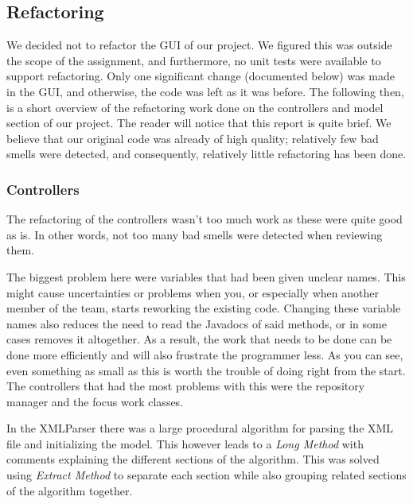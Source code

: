 		\subsection{Refactoring}
			We decided not to refactor the GUI of our project. We figured this was outside the scope of the assignment, and furthermore, no unit tests were available to support refactoring. Only one significant change (documented below) was made in the GUI, and otherwise, the code was left as it was before. The following then, is a short overview of the refactoring work done on the controllers and model section of our project. The reader will notice that this report is quite brief. We believe that our original code was already of high quality; relatively few bad smells were detected, and consequently, relatively little refactoring has been done.

			\subsubsection{Controllers}
				The refactoring of the controllers wasn't too much work as these were quite good as is. In other words, not too many bad smells were detected when reviewing them.
				
				The biggest problem here were variables that had been given unclear names. This might cause uncertainties or problems when you, or especially when another member of the team, starts reworking the existing code. Changing these variable names also reduces the need to read the Javadocs of said methods, or in some cases removes it altogether. As a result, the work that needs to be done can be done more efficiently and will also frustrate the programmer less. As you can see, even something as small as this is worth the trouble of doing right from the start. 
				The controllers that had the most problems with this were the repository manager and the focus work classes.
				
				In the XMLParser there was a large procedural algorithm for parsing the XML file and initializing the model. This however leads to a \emph{Long Method} with comments explaining the different sections of the algorithm. This was solved using \emph{Extract Method} to separate each section while also grouping related sections of the algorithm together.
				
